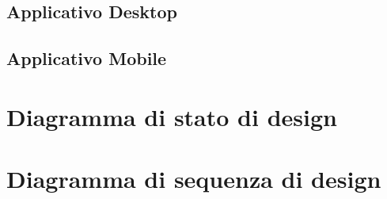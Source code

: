 \subsection{Applicativo Desktop}
    
    
    
    
    
    
    
\subsection{Applicativo Mobile}
    
    
    
\section{Diagramma di stato di design}

\section{Diagramma di sequenza di design}